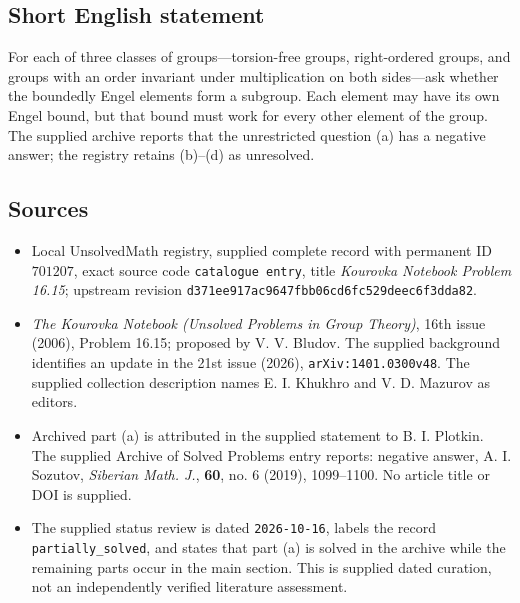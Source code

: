 \documentclass[11pt]{article}
\begin{document}
\subsection{Short English statement}
For each of three classes of groups---torsion-free groups, right-ordered groups, and groups with an order invariant under multiplication on both sides---ask whether the boundedly Engel elements form a subgroup. Each element may have its own Engel bound, but that bound must work for every other element of the group. The supplied archive reports that the unrestricted question (a) has a negative answer; the registry retains (b)--(d) as unresolved.
\subsection{Sources}
\begin{itemize}
\item Local UnsolvedMath registry, supplied complete record with permanent ID \(701207\), exact source code \texttt{catalogue entry}, title \emph{Kourovka Notebook Problem 16.15}; upstream revision \texttt{d371ee917ac9647fbb06cd6fc529deec6f3dda82}.
\item \emph{The Kourovka Notebook (Unsolved Problems in Group Theory)}, 16th issue (2006), Problem 16.15; proposed by V. V. Bludov. The supplied background identifies an update in the 21st issue (2026), \texttt{arXiv:1401.0300v48}. The supplied collection description names E. I. Khukhro and V. D. Mazurov as editors.
\item Archived part (a) is attributed in the supplied statement to B. I. Plotkin. The supplied Archive of Solved Problems entry reports: negative answer, A. I. Sozutov, \emph{Siberian Math. J.}, \textbf{60}, no. 6 (2019), 1099--1100. No article title or DOI is supplied.
\item The supplied status review is dated \texttt{2026-10-16}, labels the record \texttt{partially\_solved}, and states that part (a) is solved in the archive while the remaining parts occur in the main section. This is supplied dated curation, not an independently verified literature assessment.
\end{itemize}
\end{document}
